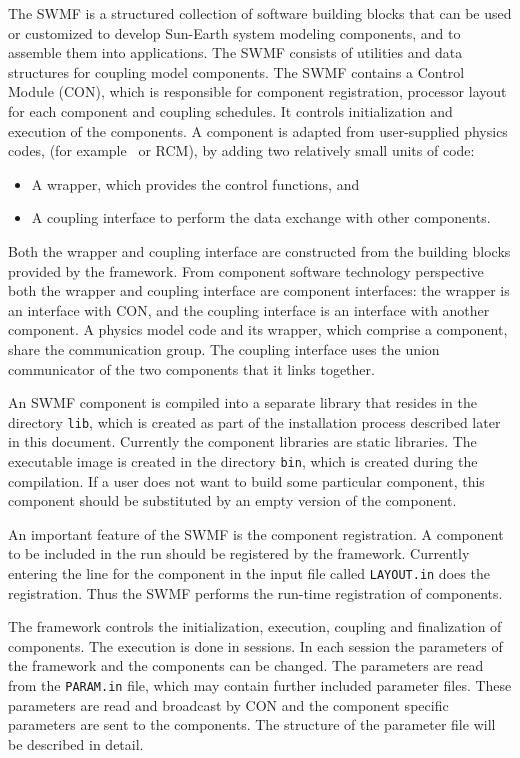 The SWMF is a structured collection of software building blocks that
can be used or customized to develop Sun-Earth system modeling
components, and to assemble them into applications. The SWMF consists
of utilities and data structures for coupling model components. The
SWMF contains a Control Module (CON), which is responsible for
component registration, processor layout for each component and
coupling schedules.  It controls initialization and execution of the
components. A component is adapted from user-supplied physics codes,
(for example \BATSRUS\ or RCM), by adding two relatively small units
of code:
\begin{itemize}
\item A wrapper, which provides the control functions, and
\item A coupling interface to perform the data exchange with other
components.
\end{itemize}
Both the wrapper and coupling interface are constructed from the
building blocks provided by the framework. From 
component software technology perspective both the wrapper and
coupling interface are component interfaces: the wrapper is an
interface with CON, and the coupling interface is an interface with
another component. A physics
model code and its wrapper, which comprise a component, share the
communication group.  The coupling interface uses the union
communicator of the two components that it links together.

An SWMF component is compiled into a separate library that resides in
the directory {\tt lib}, which is created as part of the installation
process described later in this document.  Currently the component
libraries are static libraries. The executable image is created in the
directory {\tt bin}, which is created during the compilation.  If a
user does not want to build some particular component, this component
should be substituted by an empty version of the component.

An important feature of the SWMF is the component registration.  A
component to be included in the run should be registered by the
framework.  Currently entering the line for the component in the input
file called {\tt LAYOUT.in} does the registration.  Thus the SWMF
performs the run-time registration of components.

The framework controls the initialization, execution, coupling and
finalization of components.  The execution is done in sessions. In
each session the parameters of the framework and the components can be
changed.  The parameters are read from the {\tt PARAM.in} file, which
may contain further included parameter files.  These parameters are
read and broadcast by CON and the component specific parameters are
sent to the components. The structure of the parameter file will be
described in detail.

